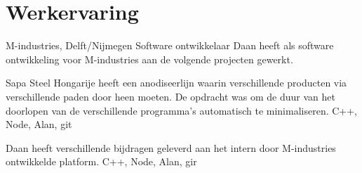\section*{Werkervaring}
	\begin{workExperience}{M-industries, Delft/Nijmegen}%
	{Software ontwikkelaar}{}
		Daan heeft als software ontwikkeling voor M-industries
                aan de volgende projecten gewerkt.

		Sapa Steel Hongarije heeft een anodiseerlijn waarin
                verschillende producten via verschillende paden door
                heen moeten.
		De opdracht was om de duur van het doorlopen van de
                verschillende programma's automatisch te
                minimaliseren.
                \technics C++, Node, Alan, git

		Daan heeft verschillende bijdragen geleverd aan het
                intern door M-industries ontwikkelde platform.
                \technics C++, Node, Alan, gir
	\end{workExperience}

